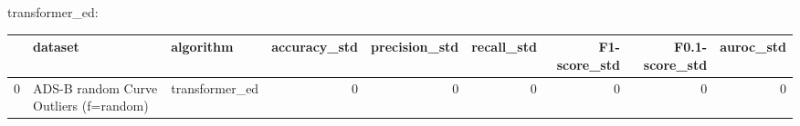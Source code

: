 transformer_ed:

\begin{tabular}{rllrrrrrr}
\hline
    & dataset                                & algorithm      &   accuracy\_std &   precision\_std &   recall\_std &   F1-score\_std &   F0.1-score\_std &   auroc\_std \\
\hline
  0 & ADS-B random Curve Outliers (f=random) & transformer\_ed &              0 &               0 &            0 &              0 &                0 &           0 \\
\hline
\end{tabular}

